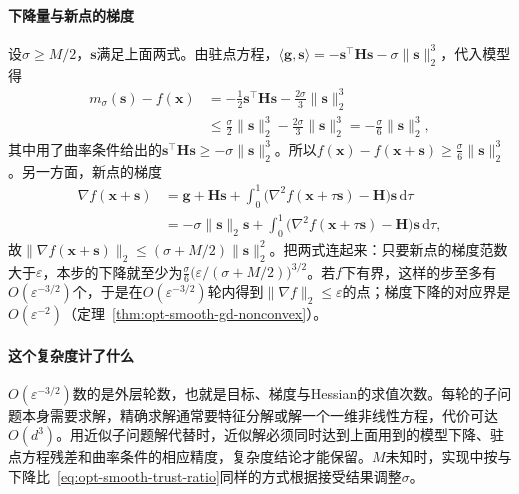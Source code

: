 \paragraph{下降量与新点的梯度}
设$\sigma\geq M/2$，$\bm s$满足上面两式。由驻点方程，$\langle\bm g,\bm s\rangle=-\bm s^\top\bm H\bm s-\sigma\lVert\bm s\rVert_2^3$，代入模型得
\[
  \begin{aligned}
  m_\sigma(\bm s)-f(\bm x)&=-\frac12\bm s^\top\bm H\bm s-\frac{2\sigma}3\lVert\bm s\rVert_2^3\\
  &\leq\frac\sigma2\lVert\bm s\rVert_2^3-\frac{2\sigma}3\lVert\bm s\rVert_2^3=-\frac\sigma6\lVert\bm s\rVert_2^3,
  \end{aligned}
\]
其中用了曲率条件给出的$\bm s^\top\bm H\bm s\geq-\sigma\lVert\bm s\rVert_2^3$。所以$f(\bm x)-f(\bm x+\bm s)\geq\tfrac\sigma6\lVert\bm s\rVert_2^3$。另一方面，新点的梯度
\[
  \begin{aligned}
  \nabla f(\bm x+\bm s)&=\bm g+\bm H\bm s+\int_0^1\bigl(\nabla^2f(\bm x+\tau\bm s)-\bm H\bigr)\bm s\,\mathrm d\tau\\
  &=-\sigma\lVert\bm s\rVert_2\bm s+\int_0^1\bigl(\nabla^2f(\bm x+\tau\bm s)-\bm H\bigr)\bm s\,\mathrm d\tau,
  \end{aligned}
\]
故$\lVert\nabla f(\bm x+\bm s)\rVert_2\leq(\sigma+M/2)\lVert\bm s\rVert_2^2$。把两式连起来：只要新点的梯度范数大于$\varepsilon$，本步的下降就至少为$\tfrac\sigma6\bigl(\varepsilon/(\sigma+M/2)\bigr)^{3/2}$。若$f$下有界，这样的步至多有$O(\varepsilon^{-3/2})$个，于是在$O(\varepsilon^{-3/2})$轮内得到$\lVert\nabla f\rVert_2\leq\varepsilon$的点；梯度下降的对应界是$O(\varepsilon^{-2})$（定理~\ref{thm:opt-smooth-gd-nonconvex}）。

\paragraph{这个复杂度计了什么}
$O(\varepsilon^{-3/2})$数的是外层轮数，也就是目标、梯度与Hessian的求值次数。每轮的子问题本身需要求解，精确求解通常要特征分解或解一个一维非线性方程，代价可达$O(d^3)$。用近似子问题解代替时，近似解必须同时达到上面用到的模型下降、驻点方程残差和曲率条件的相应精度，复杂度结论才能保留。$M$未知时，实现中按与下降比~\eqref{eq:opt-smooth-trust-ratio}同样的方式根据接受结果调整$\sigma$。
